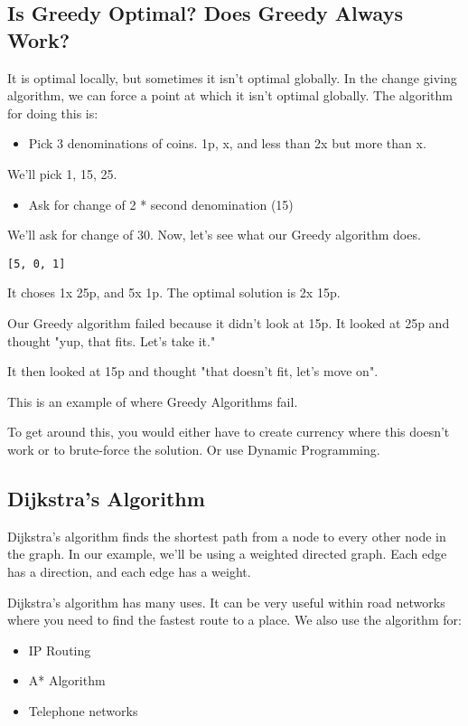 \documentclass{article}
\begin{document}
\subsection{Is Greedy Optimal? Does Greedy Always Work?}
It is optimal locally, but sometimes it isn't optimal globally. In the change giving algorithm, we can force a point at which it isn't optimal globally. 
The algorithm for doing this is:
\begin{itemize}
    \item Pick 3 denominations of coins. 1p, x, and less than 2x but more than x.
\end{itemize}

We'll pick 1, 15, 25.
\begin{itemize}
    \item Ask for change of 2 * second denomination (15)
\end{itemize}

We'll ask for change of 30. Now, let's see what our Greedy algorithm does.
 \begin{verbatim}
[5, 0, 1]
\end{verbatim}
It choses 1x 25p, and 5x 1p. The optimal solution is 2x 15p. 

Our Greedy algorithm failed because it didn't look at 15p. It looked at 25p and thought "yup, that fits. Let's take it."

It then looked at 15p and thought "that doesn't fit, let's move on".

This is an example of where Greedy Algorithms fail.

To get around this, you would either have to create currency where this doesn't work or to brute-force the solution. Or use Dynamic Programming.
\newpage
\subsection{Dijkstra's Algorithm}
Dijkstra's algorithm finds the shortest path from a node to every other node in the graph. In our example, we'll be using a weighted directed graph. Each edge has a direction, and each edge has a weight.

Dijkstra's algorithm has many uses. It can be very useful within road networks where you need to find the fastest route to a place. We also use the algorithm for:
\begin{itemize}
    \item IP Routing
    \item A* Algorithm
    \item Telephone networks
\end{itemize}
\end{document}
